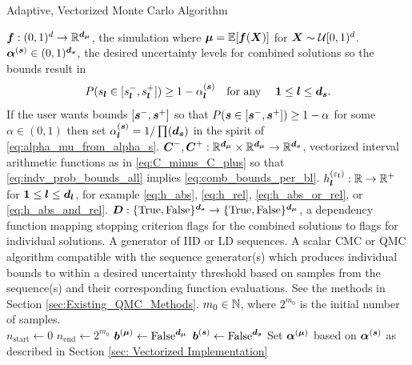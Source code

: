 \documentclass{article}[12pt]
\begin{document}
\begin{algorithm}[t]
    \caption{Adaptive, Vectorized Monte Carlo Algorithm}
    \label{algo:MCStoppingCriterion}
    \begin{algorithmic}
    \Require $\boldsymbol{f}: (0,1)^d \to \mathbb{R}^{\boldsymbol{d}_{\boldsymbol{\mu}}}$, the simulation where $\boldsymbol{\mu} = \mathbb{E}[\boldsymbol{f}(\boldsymbol{X})]$ for $\boldsymbol{X} \sim \mathcal{U}[0,1)^d$.
    \Require $\boldsymbol{\alpha}^{(\boldsymbol{s})} \in (0,1)^{\boldsymbol{d}_{\boldsymbol{s}}}$, the desired uncertainty levels for combined solutions so the bounds result in
    \begin{equation}
        P(s_{\boldsymbol{l}} \in [s_{\boldsymbol{l}}^-,s_{\boldsymbol{l}}^+]) \geq 1-\alpha^{(\boldsymbol{s})}_{\boldsymbol{l}} \quad \text{for any}\quad \; \boldsymbol{1} \leq \boldsymbol{l} \leq \boldsymbol{d}_{\boldsymbol{s}}.
        \label{eq:comb_bounds_per_bl}
    \end{equation}
    If the user wants bounds $[\boldsymbol{s}^-,\boldsymbol{s}^+]$ so that $P(\boldsymbol{s} \in [\boldsymbol{s}^-,\boldsymbol{s}^+]) \geq 1-\alpha$ for some $\alpha \in (0,1)$ then set $\alpha_{\boldsymbol{l}}^{(\boldsymbol{s})} = 1/\prod(\boldsymbol{d}_{\boldsymbol{s}})$ in the spirit of \eqref{eq:alpha_mu_from_alpha_s}.
    \Require $\boldsymbol{C}^-,\boldsymbol{C}^+: \mathbb{R}^{\boldsymbol{d}_{\boldsymbol{\mu}}} \times \mathbb{R}^{\boldsymbol{d}_{\boldsymbol{\mu}}} \to \mathbb{R}^{\boldsymbol{d}_{\boldsymbol{s}}}$, vectorized interval arithmetic functions as in \eqref{eq:C_minus_C_plus} so that \eqref{eq:indv_prob_bounds_all} implies \eqref{eq:comb_bounds_per_bl}.
    \Require $h^{(\varepsilon_{\boldsymbol{l}})}_{\boldsymbol{l}}: \mathbb{R} \to \mathbb{R}^+$ for $\boldsymbol{1} \leq \boldsymbol{l} \leq \boldsymbol{d}_{\boldsymbol{l}}$, for example \eqref{eq:h_abs}, \eqref{eq:h_rel}, \eqref{eq:h_abs_or_rel}, or \eqref{eq:h_abs_and_rel}.
    \Require $\boldsymbol{D}: \{\text{True},\text{False}\}^{\boldsymbol{d}_{\boldsymbol{s}}} \to \{\text{True},\text{False}\}^{\boldsymbol{d}_{\boldsymbol{\mu}}}$, a dependency function mapping stopping criterion flags for the combined solutions to flags for individual solutions. 
    \Require A generator of IID or LD sequences.
    \Require A scalar CMC or QMC algorithm compatible with the sequence generator(s) which produces individual bounds to within a desired uncertainty threshold based on samples from the sequence(s) and their corresponding function evaluations. See the methods in Section \ref{sec:Existing_QMC_Methods}.
    \Require $m_0 \in \mathbb{N}$, where $2^{m_0}$ is the initial number of samples.
    \\ \hrulefill
    \State $n_\text{start} \gets 0$ 
    \State $n_\text{end} \gets 2^{m_0}$ 
    \State $\boldsymbol{b}^{(\boldsymbol{\mu})} \gets \text{False}^{\boldsymbol{d}_{\boldsymbol{\mu}}}$ 
    \State $\boldsymbol{b}^{(\boldsymbol{s})} \gets \text{False}^{\boldsymbol{d}_{\boldsymbol{s}}}$ 
    \State Set $\boldsymbol{\alpha}^{(\boldsymbol{\mu})}$ based on $\boldsymbol{\alpha}^{(\boldsymbol{s})}$ as described in Section \ref{sec: Vectorized Implementation}

\end{algorithmic}
\end{algorithm}
\end{document}

